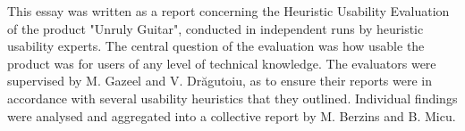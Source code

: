 This essay was written as a report concerning the Heuristic Usability Evaluation of the product "Unruly Guitar", conducted in independent runs by heuristic usability experts. The central question of the evaluation was how usable the product was for users of any level of technical knowledge. The evaluators were supervised by M. Gazeel and V. Drăgutoiu, as to ensure their reports were in accordance with several usability heuristics that they outlined. Individual findings were analysed and aggregated into a collective report by M. Berzins and B. Micu.
